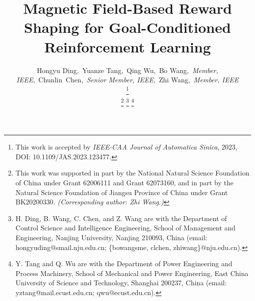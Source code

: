 \documentclass[journal]{IEEEtran}
\begin{document}
\title{Magnetic Field-Based Reward Shaping for Goal-Conditioned Reinforcement Learning}
\author{Hongyu Ding,~Yuanze Tang,~Qing Wu,~Bo Wang,~\textit{Member, IEEE},~Chunlin~Chen,~\textit{Senior Member, IEEE},~\newline Zhi Wang,~\textit{Member, IEEE}
	
\thanks{This work is accepted by \textit{IEEE-CAA Journal of Automatica Sinica}, 2023, DOI: 10.1109/JAS.2023.123477.}

\thanks{This work was supported in part by the National Natural Science Foundation of China under Grant 62006111 and Grant 62073160, and in part by the Natural Science Foundation of Jiangsu Province of China under Grant BK20200330. \textit{(Corresponding author: Zhi Wang.)}}
\thanks{H. Ding, B. Wang, C. Chen, and Z. Wang are with the Department of Control Science and Intelligence Engineering, School of Management and Engineering, Nanjing University, Nanjing 210093, China (email: hongyuding@smail.nju.edu.cn; \{bowangsme, clchen, zhiwang\}@nju.edu.cn).}
\thanks{Y. Tang and Q. Wu are with the Department of Power Engineering and Process Machinery, School of Mechanical and Power Engineering, East China University of Science and Technology, Shanghai 200237, China (email: yztang@mail.ecust.edu.cn; qwu@ecust.edu.cn).}
}

\maketitle
\end{document}
